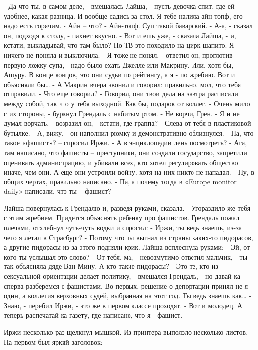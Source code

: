 \documentclass[10pt,final]{book}
\begin{document}
- Да что ты, в самом деле, - вмешалась Лайша, - пусть девочка спит, где ей удобнее, какая разница. И вообще садись за стол. Я тебе налила айн-топф, его надо есть горячим.
- Айн -- что?
- Айн-топф. Суп такой баварский.
- А-а, - сказал он, подходя к столу, - пахнет вкусно.
- Вот и ешь уже, - сказала Лайша, - и, кстати, выкладывай, что там было? По ТВ это походило на цирк шапито. Я ничего не поняла и выключила.
- Я тоже не понял, - ответил он, проглотив первую ложку супа, - надо было ехать Джелле или Макрину. Или, хотя бы, Ашуру. В конце концов, это они судьи по рейтингу, а я - по жребию. Вот и объясняли бы\ldots{}
- А Макрин вчера звонил и говорил: правильно, мол, что тебя отправили.
- Что еще говорил?
- Говорил, они твои дела на завтра расписали между собой, так что у тебя выходной. Как бы, подарок от коллег.
- Очень мило с их стороны, - буркнул Грендаль с набитым ртом.
- Не ворчи, Грен.
- Я и не думал ворчать, - возразил он, - кстати, где граппа?
- Слева от тебя в пластиковой бутылке.
- А, вижу, - он наполнил рюмку и демонстративно облизнулся.
- Па, что такое «фашист»? -- спросил Иржи.
- А в энциклопедии лень посмотреть?
- Ага, там написано, что фашисты -- преступники, они создали государство, запретили оценивать администрацию, и убивали всех, кто хотел регулировать общество иначе, чем они. А еще они устроили войну, хотя на них никто не нападал.
- Ну, в общих чертах, правильно написано.
- Па, а почему тогда в «Europe monitor daily» написали, что ты -- фашист?

Лайша повернулась к Грендалю и, разведя руками, сказала.
- Угораздило же тебя с этим жребием. Придется объяснять ребенку про фашистов.
Грендаль пожал плечами, отхлебнул чуть-чуть водки и спросил:
- Иржи, ты ведь знаешь, из-за чего я летал в Страсбург?
- Потому что ты выгнал из страны каких-то пидорасов, а другие пидорасы из-за этого подняли крик.
Лайша всплеснула руками:
- Эй, от кого ты услышал это слово?
- От тебя, ма, - невозмутимо ответил мальчик, - ты так объясняла дяде Ван Мину. А кто такие пидорасы?
- Это те, кто из сексуальной ориентации делает политику, - вмешался Грендаль, - но давай-ка сперва разберемся с фашистами. Во-первых, решение о депортации принял не я один, а коллегия верховных судей, выбранная на этот год. Ты ведь знаешь как\ldots{}
- Знаю, - перебил Иржи, - это же в первом классе проходят.
- Вот и молодец. А теперь распечатай-ка газету, где написано, что я - фашист.

Иржи несколько раз щелкнул мышкой. Из принтера выползло несколько листов. На первом был яркий заголовок:
\end{document}
